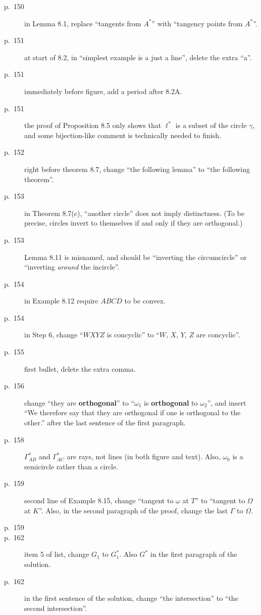 \documentclass[11pt]{scrartcl}
\begin{document}
\begin{description}
\item[p.\  150] in Lemma 8.1, replace ``tangents from $A^\ast$'' with ``tangency points from $A^\ast$''.
\item[p.\  151] at start of 8.2, in ``simplest example is a just a line'', delete the extra ``a''.
\item[p.\  151] immediately before figure, add a period after 8.2A.
\item[p.\  151] the proof of Proposition 8.5 only shows that $\ell^\ast$ is a subset of the circle
  $\gamma$, and some bijection-like comment is technically needed to finish.
\item[p.\  152] right before theorem 8.7,
  change ``the following lemma'' to ``the following theorem''.
\item[p.\  153] in Theorem 8.7(c), ``another circle'' does not imply distinctness.
  (To be precise, circles invert to themselves if and only if they are orthogonal.)
\item[p.\  153] Lemma 8.11 is misnamed, and should be ``inverting the circumcircle''
  or ``inverting \emph{around} the incircle''.
\item[p.\  154] in Example 8.12 require $ABCD$ to be convex.
\item[p.\  154] in Step 6, change ``$WXYZ$ is concyclic'' to ``$W$, $X$, $Y$, $Z$ are concyclic''.
\item[p.\  155] first bullet, delete the extra comma.
\item[p.\  156] change ``they are \textbf{orthogonal}'' to ``$\omega_1$ is \textbf{orthogonal} to $\omega_2$'',
  and insert ``We therefore say that they are orthogonal if one is orthogonal to the other.'' after the last sentence of the first paragraph.
\item[p.\  158] $\Gamma_{AB}^\ast$ and $\Gamma_{AC}^\ast$ are rays, not lines (in both figure and text).
  Also, $\omega_0$ is a semicircle rather than a circle.
\item[p.\  159] second line of Example 8.15,
  change ``tangent to $\omega$ at $T$'' to ``tangent to $\Omega$ at $K$''.
  Also, in the second paragraph of the proof, change the last $\Gamma$ to $\Omega$.
\item[p.\  159] 
\item[p.\  162] item 5 of list, change $G_1$ to $G_1^\ast$.
  Also $G^\ast$ in the first paragraph of the solution.
\item[p.\  162] in the first sentence of the solution,
  change ``the intersection'' to ``the second intersection''.

\end{description}
\end{document}
